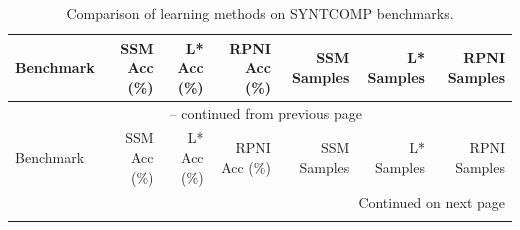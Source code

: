 \begin{small}  %
\begin{longtable}{p{5cm}|rrr|rrr}
\caption{Comparison of learning methods on SYNTCOMP benchmarks.} \label{tab:benchmark_comparison} \\
\toprule
Benchmark & SSM Acc (\%) & L* Acc (\%) & RPNI Acc (\%) & SSM Samples & L* Samples & RPNI Samples \\
\midrule
\endfirsthead

\multicolumn{7}{c}{\tablename\ \thetable{} -- continued from previous page} \\
\toprule
Benchmark & SSM Acc (\%) & L* Acc (\%) & RPNI Acc (\%) & SSM Samples & L* Samples & RPNI Samples \\
\midrule
\endhead

\midrule
\multicolumn{7}{r}{Continued on next page} \\
\endfoot

\bottomrule
\endlastfoot


\end{longtable}
\end{small}

